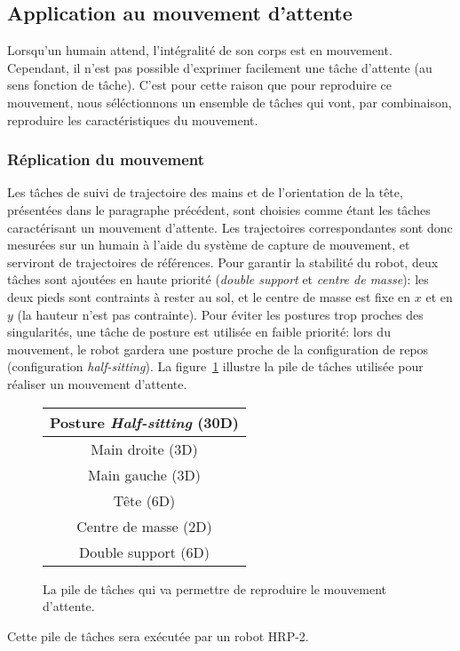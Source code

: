 
\subsection{Application au mouvement d'attente}
\label{chap:activeWait}
Lorsqu'un humain attend, l'intégralité de son corps est en mouvement.
Cependant, il n'est pas possible d'exprimer facilement une t\^ache d'attente
(au sens fonction de t\^ache).
C'est pour cette raison que pour reproduire ce mouvement, nous séléctionnons
un ensemble de t\^aches qui vont, par combinaison, reproduire
les caractéristiques du mouvement.
\subsubsection{Réplication du mouvement}
Les t\^aches de suivi de trajectoire des mains
et de l'orientation de la tête, présentées dans le paragraphe précédent,
sont choisies comme étant les t\^aches caractérisant un mouvement 
d'attente. Les trajectoires correspondantes sont donc mesurées sur un humain
à l'aide du système de capture de mouvement, et serviront de trajectoires
de références.
Pour garantir la stabilité du robot, deux t\^aches
sont ajoutées en haute priorité (\emph{double support} et \emph{centre de masse}): 
les deux pieds sont contraints à rester au sol, et le centre de masse
est fixe en $x$ et en $y$ (la hauteur n'est pas contrainte).
Pour éviter les postures trop proches des singularités,
une t\^ache de posture est utilisée en faible priorité: lors du mouvement, le robot
gardera une posture proche de la configuration de repos (configuration \emph{half-sitting}).
La figure~\ref{fig:sotActiveWait} illustre la pile de t\^aches utilisée pour réaliser
un mouvement d'attente.
\begin{figure}[t]
  \begin{center}
    \begin{tabular}{|c|}
      \hline
      Posture \emph{Half-sitting} (30D)\\
      \hline
      Main droite (3D)\\
      \hline
      Main gauche (3D)\\
      \hline
      Tête (6D)\\
      \hline
      Centre de masse (2D)\\
      \hline
      Double support (6D)\\
      \hline
    \end{tabular}
  \end{center}
  \caption{La pile de t\^aches qui va permettre de reproduire le mouvement d'attente.}
  \label{fig:sotActiveWait}
\end{figure}
Cette pile de t\^aches sera exécutée par un robot HRP-2.

